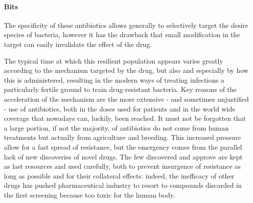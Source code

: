
\paragraph{Bits}

The specificity of these antibiotics allows generally to selectively target the desire species of bacteria, however it has the drawback that small modification in the target can easily invalidate the effect of the drug. 

The typical time at which this resilient population appears varies greatly according to the mechanism targeted by the drug, but also and especially by how this is administered, resulting in the modern ways of treating infections a particularly fertile ground to train drug-resistant bacteria. Key reasons of the acceleration of the mechanism are the more extensive - and sometimes unjustified - use of antibiotics, both in the doses used for patients and in the world wide coverage that nowadays can, luckily, been reached. It must not be forgotten that a large portion, if not the majority, of antibiotics do not come from human treatments but actually from agriculture and breeding.
%
This increased pressure allow for a fast spread of resistance, but the emergency comes from the parallel lack of new discoveries of novel drugs. The few discovered and approve are kept as last resources and used carefully, both to prevent insurgence of resistance as long as possible and for their collateral effects: indeed, the inefficacy of other drugs has pushed pharmaceutical industry to resort to compounds discarded in the first screening because too toxic for the human body.





